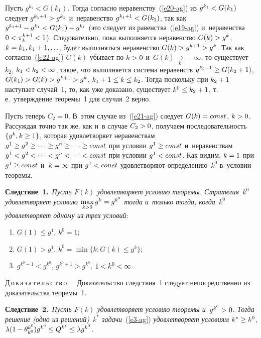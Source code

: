 \begin{multicols}{2}
  Пусть $g^{k_1}< G(k_1)$. Тогда согласно неравенству~(\ref{e20-ag}) из 
$g^{k_1} \hm< G(k_1)$ следует $g^{k_1+1} \hm> g^{k_1}$ и~неравенство 
$g^{k_1+1} \hm< G(k_1)$, так как $g^{k_1+1} \hm- g^{k_1}\hm< G(k_1) \hm- 
g^{k_1}$ (это следует из равенства~(\ref{e19-ag}) и~неравенства $0\hm < 
\pi_k^{k+1} \hm<1$). Следовательно, пока выполняется неравенство $G(k) \hm> 
g^k$, $k\hm= k_1, k_1+1, \ldots$, будет выполняться неравенство $G(k) \hm> 
g^{k+1}\hm> g^k$. Так как согласно~(\ref{e22-ag}) $G(k)$ убывает по $k\hm>0$ 
и~$G(k)\underset{k}{\to} -\infty$, то существует~$k_2$, $k_1\hm< k_2\hm< 
\infty$, такое, что выполняется система неравенств $g^{k_2+1} \hm\geq 
G(k_2+1)$, $G(k_1)\hm> G(k) \hm> g^{k+1}\hm> g^k$, $k_1 +1\hm\leq k\hm\leq 
k_2$. Тогда поскольку при $k_2\hm+1$ наступает случай~1, то, как уже 
доказано, существует $k^0\hm\leq k_2\hm+1$, т.\,е.\ утверждение теоремы~1 
для случая~2 верно.
  
  Пусть теперь $C_2=0$. В~этом случае из~(\ref{e21-ag}) следует $G(k)\hm= 
const$, $k\hm>0$. Рассуждая точно так же, как и~в случае $C_2\hm>0$, 
получаем последовательность $\{ g^k, k\hm\geq 1\}$, которая удовлетворяет 
неравенствам $g^1\hm\geq g^2\geq \cdots \geq g^n\geq \cdots \geq const$ при 
условии $g^1\hm\geq const$ и~неравенствам $g^1\hm< g^2<\cdots < g^n< \cdots < 
const$ при условии $g^1\hm< const$. Как видим, $k\hm=1$ при $g^1\hm\geq 
const$ и~$k\hm=\infty$ при $g^1\hm< const$ удовлетворяют определению~$k^0$ 
в~условии теоремы. 
  
  \smallskip
  
  \noindent
  \textbf{Следствие~1.}\ \textit{Пусть $F(k)$ удовлетворяет условию 
теоремы. Стратегия~$k^0$ удовлетворяет условию $\max\limits_{k>0} g^k\hm= 
g^{k^0}$ тогда и~только тогда, когда~$k^0$ удовле\-тво\-ря\-ет одному из трех 
условий}:
  \begin{enumerate}[(1)]
  \item $G(1) \leq g^1$, $k^0=1$;
  \item $G(1)>g^1$, $k^0=\min\{ k: G(k)\leq g^k\}$;
  \item $g^{k^0-1} <g^{k^0}$, $g^{k^0+1} >g^{k^0}$, $1\hm< k^0\hm< \infty$.
  \end{enumerate}
  
  \noindent
  Д\,о\,к\,а\,з\,а\,т\,е\,л\,ь\,с\,т\,в\,о\,.\ \ Доказательство следствия~1 
следует непосредственно из доказательства теоремы~1. 
  
  \smallskip
  
  \noindent
  \textbf{Следствие~2.}\ \textit{Пусть $F(k)$ удовлетворяет условию 
тео\-ре\-мы и~$g^{k^0}\hm>0$. Тогда решение (одно из решений)~$k^*$ 
задачи}~(\ref{e3-ag}) \textit{удовлетворяет условиям} $k^*\hm\geq k^0$, $\lambda(1-
\theta_{k^0}^{k^0})g^{k^0}\hm\leq Q^{k^*}\hm \leq \lambda g^{k^0}$. 
  

\end{multicols}
